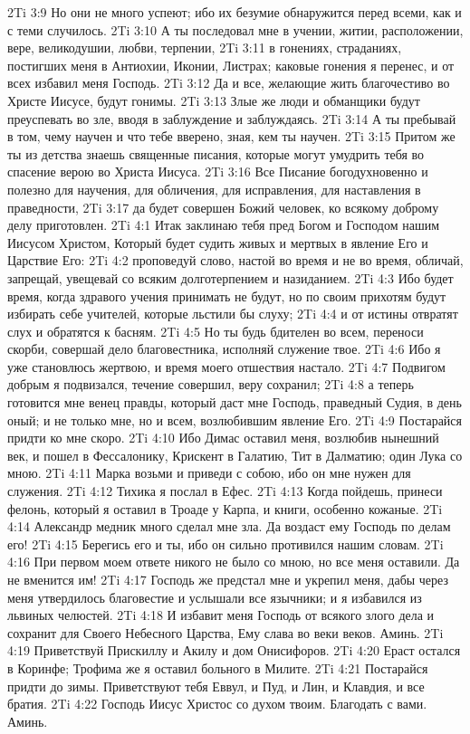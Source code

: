 2Ti 3:9  Но они не много успеют; ибо их безумие обнаружится перед всеми, как и с теми случилось.
2Ti 3:10  А ты последовал мне в учении, житии, расположении, вере, великодушии, любви, терпении,
2Ti 3:11  в гонениях, страданиях, постигших меня в Антиохии, Иконии, Листрах; каковые гонения я перенес, и от всех избавил меня Господь.
2Ti 3:12  Да и все, желающие жить благочестиво во Христе Иисусе, будут гонимы.
2Ti 3:13  Злые же люди и обманщики будут преуспевать во зле, вводя в заблуждение и заблуждаясь.
2Ti 3:14  А ты пребывай в том, чему научен и что тебе вверено, зная, кем ты научен.
2Ti 3:15  Притом же ты из детства знаешь священные писания, которые могут умудрить тебя во спасение верою во Христа Иисуса.
2Ti 3:16  Все Писание богодухновенно и полезно для научения, для обличения, для исправления, для наставления в праведности,
2Ti 3:17  да будет совершен Божий человек, ко всякому доброму делу приготовлен.
2Ti 4:1  Итак заклинаю тебя пред Богом и Господом нашим Иисусом Христом, Который будет судить живых и мертвых в явление Его и Царствие Его:
2Ti 4:2  проповедуй слово, настой во время и не во время, обличай, запрещай, увещевай со всяким долготерпением и назиданием.
2Ti 4:3  Ибо будет время, когда здравого учения принимать не будут, но по своим прихотям будут избирать себе учителей, которые льстили бы слуху;
2Ti 4:4  и от истины отвратят слух и обратятся к басням.
2Ti 4:5  Но ты будь бдителен во всем, переноси скорби, совершай дело благовестника, исполняй служение твое.
2Ti 4:6  Ибо я уже становлюсь жертвою, и время моего отшествия настало.
2Ti 4:7  Подвигом добрым я подвизался, течение совершил, веру сохранил;
2Ti 4:8  а теперь готовится мне венец правды, который даст мне Господь, праведный Судия, в день оный; и не только мне, но и всем, возлюбившим явление Его.
2Ti 4:9  Постарайся придти ко мне скоро.
2Ti 4:10  Ибо Димас оставил меня, возлюбив нынешний век, и пошел в Фессалонику, Крискент в Галатию, Тит в Далматию; один Лука со мною.
2Ti 4:11  Марка возьми и приведи с собою, ибо он мне нужен для служения.
2Ti 4:12  Тихика я послал в Ефес.
2Ti 4:13  Когда пойдешь, принеси фелонь, который я оставил в Троаде у Карпа, и книги, особенно кожаные.
2Ti 4:14  Александр медник много сделал мне зла. Да воздаст ему Господь по делам его!
2Ti 4:15  Берегись его и ты, ибо он сильно противился нашим словам.
2Ti 4:16  При первом моем ответе никого не было со мною, но все меня оставили. Да не вменится им!
2Ti 4:17  Господь же предстал мне и укрепил меня, дабы через меня утвердилось благовестие и услышали все язычники; и я избавился из львиных челюстей.
2Ti 4:18  И избавит меня Господь от всякого злого дела и сохранит для Своего Небесного Царства, Ему слава во веки веков. Аминь.
2Ti 4:19  Приветствуй Прискиллу и Акилу и дом Онисифоров.
2Ti 4:20  Ераст остался в Коринфе; Трофима же я оставил больного в Милите.
2Ti 4:21  Постарайся придти до зимы. Приветствуют тебя Еввул, и Пуд, и Лин, и Клавдия, и все братия.
2Ti 4:22  Господь Иисус Христос со духом твоим. Благодать с вами. Аминь.


